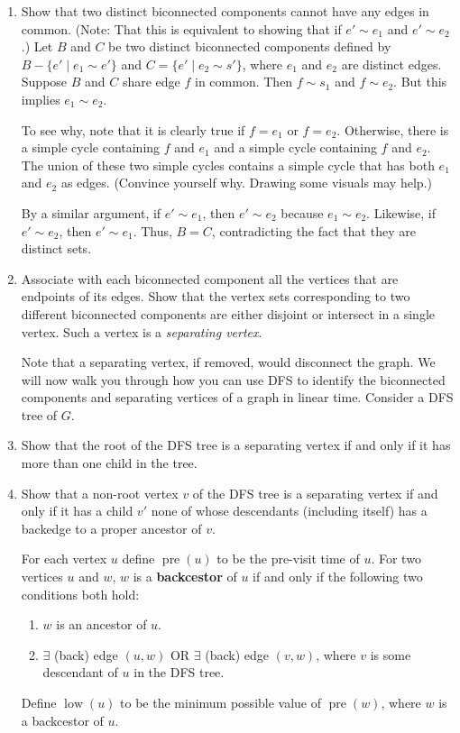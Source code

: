 \documentclass{article}\usepackage[utf8]{inputenc}
\begin{document}
\begin{enumerate}
\item Show that two distinct biconnected components cannot have any edges in common. (Note: That this is equivalent to showing that if $e'\sim e_1$ and $e'\sim e_2$.)
\BeginSolution %
Let $B$ and $C$ be two distinct biconnected components defined by $B-\{e'\mid e_1\sim e'\}$ and $C=\{e'\mid e_2\sim s'\}$, where $e_1$ and $e_2$ are distinct edges. Suppose $B$ and $C$ share edge $f$ in common. Then $f\sim s_1$ and $f\sim e_2$. But this implies $e_1\sim e_2$. 

\vspace{3pt}
To see why, note that it is clearly true if $f=e_1$ or $f=e_2$. Otherwise, there is a simple cycle containing $f$ and $e_1$ and a simple cycle containing $f$ and $e_2$. The union of these two simple cycles contains a simple cycle that has both $e_1$ and $e_2$ as edges. (Convince yourself why. Drawing some visuals may help.)

\vspace{3pt}
By a similar argument, if $e'\sim e_1$, then $e'\sim e_2$ because $e_1\sim e_2$. Likewise, if $e'\sim e_2$, then $e'\sim e_1$. Thus, $B=C$, contradicting the fact that they are distinct sets.
\EndSolution
\item Associate with each biconnected component all the vertices that are endpoints of its edges. Show that the vertex sets corresponding to two different biconnected components are either disjoint or intersect in a single vertex. Such a vertex is a \textit{separating vertex}.

\noindent 
Note that a separating vertex, if removed, would disconnect the graph. We will now walk you through how you can use DFS to identify the biconnected components and separating vertices of a graph in linear time. Consider a DFS tree of $G$.
\BeginSolution %

\EndSolution
\item Show that the root of the DFS tree is a separating vertex if and only if it has more than one child in the tree.
\BeginSolution %

\EndSolution
\item Show that a non-root vertex $v$ of the DFS tree is a separating vertex if and only if it has a child $v'$ none of whose descendants (including itself) has a backedge to a proper ancestor of $v$.

\noindent For each vertex $u$ define $\operatorname{pre}(u)$ to be the pre-visit time of $u$. For two vertices $u$ and $w$, $w$ is a \textbf{backcestor} of $u$ if and only if the following two conditions both hold:
\begin{enumerate}[1.]
\item $w$ is an ancestor of $u$.
\item $\exists$ (back) edge $(u,w)$ OR $\exists$ (back) edge $(v,w)$, where $v$ is some descendant of $u$ in the DFS tree.
\end{enumerate}
\noindent Define $\operatorname{low}(u)$ to be the minimum possible value of $\operatorname{pre}(w)$, where $w$ is a backcestor of $u$.


\end{enumerate}
\end{document}
